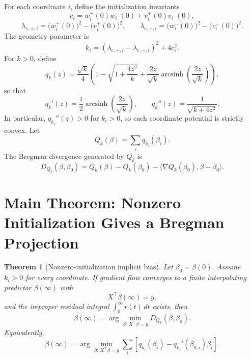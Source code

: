 \documentclass[11pt]{article}
\newtheorem{theorem}{Theorem}
\begin{document}
For each coordinate \(i\), define the initialization invariants
\begin{equation}
    c_i
    =
    w_i^+(0)w_i^-(0)+v_i^+(0)v_i^-(0),
\end{equation}
\begin{equation}
    \lambda_{e,+,i}
    =
    \bigl(w_i^+(0)\bigr)^2-\bigl(v_i^+(0)\bigr)^2,
    \qquad
    \lambda_{e,-,i}
    =
    \bigl(w_i^-(0)\bigr)^2-\bigl(v_i^-(0)\bigr)^2.
\end{equation}
The geometry parameter is
\begin{equation}
    k_i
    =
    (\lambda_{e,+,i}-\lambda_{e,-,i})^2+4c_i^2.
\end{equation}
For \(k>0\), define
\begin{equation}
    q_k(z)
    =
    \frac{\sqrt{k}}{4}
    \left(
        1-
        \sqrt{1+\frac{4z^2}{k}}
        +
        \frac{2z}{\sqrt{k}}
        \operatorname{arcsinh}\left(\frac{2z}{\sqrt{k}}\right)
    \right),
\end{equation}
so that
\begin{equation}
    q_k'(z)=\frac12\operatorname{arcsinh}\left(\frac{2z}{\sqrt{k}}\right),
    \qquad
    q_k''(z)=\frac{1}{\sqrt{k+4z^2}}.
\end{equation}
In particular, \(q_{k_i}''(z)>0\) for \(k_i>0\), so each coordinate potential is strictly convex.
Let
\begin{equation}
    Q_k(\beta)=\sum_i q_{k_i}(\beta_i).
\end{equation}
The Bregman divergence generated by \(Q_k\) is
\begin{equation}
    D_{Q_k}(\beta,\beta_0)
    =
    Q_k(\beta)-Q_k(\beta_0)
    -
    \langle\nabla Q_k(\beta_0),\beta-\beta_0\rangle .
\end{equation}

\section{Main Theorem: Nonzero Initialization Gives a Bregman Projection}

\begin{theorem}[Nonzero-initialization implicit bias]
Let \(\beta_0=\beta(0)\). Assume \(k_i>0\) for every coordinate. If gradient flow converges to a finite interpolating predictor \(\beta(\infty)\) with
\begin{equation}
    X^\top\beta(\infty)=y,
\end{equation}
and the improper residual integral \(\int_0^\infty r(t)\,dt\) exists, then
\begin{equation}
    \boxed{
    \beta(\infty)
    =
    \arg\min_{\beta:\,X^\top\beta=y}
    D_{Q_k}(\beta,\beta_0)
    } .
\end{equation}
Equivalently,
\begin{equation}
    \boxed{
    \beta(\infty)
    =
    \arg\min_{\beta:\,X^\top\beta=y}
    \sum_i
    \left[
        q_{k_i}(\beta_i)-q_{k_i}'(\beta_{0,i})\beta_i
    \right]
    } .
\end{equation}
\end{theorem}
\end{document}
